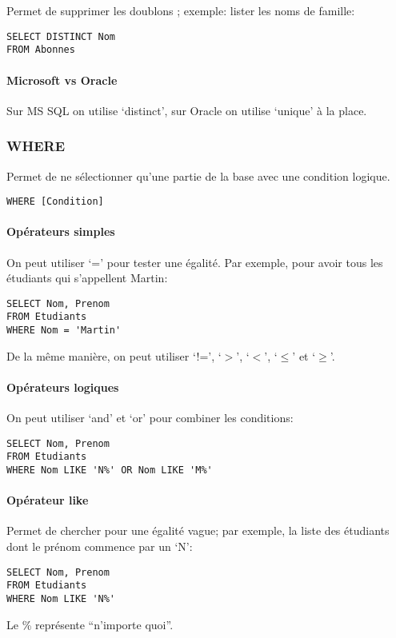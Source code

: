 \documentclass[10pt,a4paper,french]{article}
\begin{document}
Permet de supprimer les doublons ; exemple: lister les noms de famille:
\begin{verbatim}
SELECT DISTINCT Nom
FROM Abonnes
\end{verbatim}

\paragraph{Microsoft vs Oracle}
Sur MS SQL on utilise `\gls{distinct}', sur Oracle on utilise `\gls{unique}' à la place.

\subsubsection{WHERE}

Permet de ne sélectionner qu'une partie de la base avec une condition logique.
\begin{verbatim}
WHERE [Condition]
\end{verbatim}

\paragraph{Opérateurs simples}
On peut utiliser `=' pour tester une égalité. Par exemple, pour avoir tous les étudiants qui s'appellent Martin:
\begin{verbatim}
SELECT Nom, Prenom
FROM Etudiants
WHERE Nom = 'Martin'
\end{verbatim}
De la même manière, on peut utiliser `!=', `$>$', `$<$', `$\leq$' et `$\geq$'.

\paragraph{Opérateurs logiques}
On peut utiliser `\gls{and}' et `\gls{or}' pour combiner les conditions:
\begin{verbatim}
SELECT Nom, Prenom
FROM Etudiants
WHERE Nom LIKE 'N%' OR Nom LIKE 'M%'
\end{verbatim}

\paragraph{Opérateur \gls{like}}
Permet de chercher pour une égalité vague; par exemple, la liste des étudiants dont le prénom commence par un `N':
\begin{verbatim}
SELECT Nom, Prenom
FROM Etudiants
WHERE Nom LIKE 'N%'
\end{verbatim}
Le \% représente ``n'importe quoi''.
\end{document}
